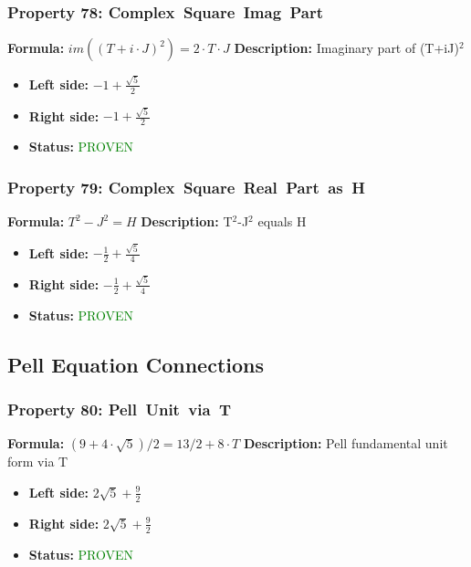 \subsubsection*{Property 78: Complex~Square~Imag~Part}
\textbf{Formula:} $im((T+i \cdot J)^2) = 2 \cdot T \cdot J$
\textbf{Description:} Imaginary part of (T+iJ)$^2$

\begin{itemize}
\item \textbf{Left side:} $-1 + \frac{\sqrt{5}}{2}$
\item \textbf{Right side:} $-1 + \frac{\sqrt{5}}{2}$
\item \textbf{Status:} \textcolor{green}{PROVEN}
\end{itemize}

\subsubsection*{Property 79: Complex~Square~Real~Part~as~H}
\textbf{Formula:} $T^2-J^2 = H$
\textbf{Description:} T$^2$-J$^2$ equals H

\begin{itemize}
\item \textbf{Left side:} $- \frac{1}{2} + \frac{\sqrt{5}}{4}$
\item \textbf{Right side:} $- \frac{1}{2} + \frac{\sqrt{5}}{4}$
\item \textbf{Status:} \textcolor{green}{PROVEN}
\end{itemize}


\subsection{Pell Equation Connections}

\subsubsection*{Property 80: Pell~Unit~via~T}
\textbf{Formula:} $(9+4 \cdot \sqrt{5})/2 = 13/2 + 8 \cdot T$
\textbf{Description:} Pell fundamental unit form via T

\begin{itemize}
\item \textbf{Left side:} $2 \sqrt{5} + \frac{9}{2}$
\item \textbf{Right side:} $2 \sqrt{5} + \frac{9}{2}$
\item \textbf{Status:} \textcolor{green}{PROVEN}
\end{itemize}

